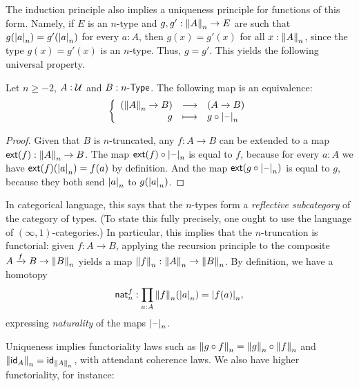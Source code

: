 The induction principle also implies a uniqueness principle for functions of this form.
%
Namely, if $E$ is an $n$-type and $g,g':\trunc nA\to{}E$ are such
that $g(\tproj na)=g'(\tproj na)$ for every $a:A$, then $g(x)=g'(x)$ for all $x:\trunc nA$, since the type $g(x)=g'(x)$ is an $n$-type.
Thus, $g=g'$.
This yields the following universal property.

\begin{lem}\label{thm:trunc-reflective}
  Let $n\ge-2$, $A:\type$ and $B:\typele{n}$. The following map is an
  equivalence:
  \[\function{(\trunc nA\to{}B)}{(A\to{}B)}{g}{g\circ\tprojf n}\]
\end{lem}

\begin{proof}
  Given that $B$ is $n$-truncated, any $f:A\to{}B$ can be extended to a map $\extend{f}:\trunc nA\to{}B$.
  The map $\extend{f}\circ\tprojf n$ is equal to $f$, because for every $a:A$ we have $\extend{f}(\tproj na)=f(a)$ by definition.
  And the map $\extend{g\circ\tprojf n}$ is equal to $g$, because they both send $\tproj na$ to $g(\tproj na)$.
\end{proof}

In categorical language, this says that the $n$-types form a \emph{reflective subcategory} of the category of types.
%
(To state this fully precisely, one ought to use the language of $(\infty,1)$-categories.)
%
In particular, this implies that the $n$-truncation is functorial:
given $f:A\to B$, applying the recursion principle to the composite $A\xrightarrow{f} B \to \trunc n B$ yields a map $\trunc n f: \trunc n A \to \trunc n B$.
By definition, we have a homotopy
\begin{equation}
  \mathsf{nat}^f_n : \prd{a:A} \trunc n f(\tproj n a) = \tproj n {f(a)},\label{eq:trunc-nat}
\end{equation}
expressing \emph{naturality} of the maps $\tprojf n$.

Uniqueness implies functoriality laws such as $\trunc n {g\circ f} = \trunc n g \circ \trunc n f$ and $\trunc n{\idfunc[A]} = \idfunc[\trunc n A]$, with attendant coherence laws.
We also have higher functoriality, for instance:

